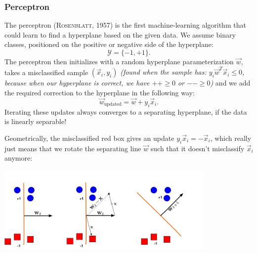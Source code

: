 \documentclass{article}
\begin{document}
\subsubsection{Perceptron}
The perceptron (\textsc{Rosenblatt}, 1957) is the first machine-learning algorithm that could learn to find a hyperplane based on the given data. We assume binary classes, positioned on the positive or negative side of the hyperplane:
\begin{equation}
    \mathcal{Y} = \{-1,+1\}.
\end{equation}
The perceptron then initializes with a random hyperplane parameterization $\vec{w}$, takes a misclassified sample $(\vec{x}_i,y_i)$ \textit{(found when the sample has: $y_i\vec{w}^T\vec{x}_i\leq 0$, because when our hyperplane is correct, we have $++\geq 0$ or $--\geq 0$)} and we add the required correction to the hyperplane in the following way:
\begin{equation}
    \vec{w}_\text{updated} = \vec{w} + y_i \vec{x}_i.
\end{equation}
Iterating these updates always converges to a separating hyperplane, if the data is linearly separable!
\begin{testexample}
    Geometrically, the misclassified red box gives an update $y_i\vec{x}_i=-\vec{x}_i$, which really just means that we rotate the separating line $\vec{w}$ such that it doesn't misclassify $\vec{x}_i$ anymore:
    \begin{center}\includegraphics[width=0.8\textwidth,trim={0cm 0cm 3.2cm 2cm},clip]{PerceptronUpdate.png}\end{center}
\end{testexample}
\end{document}
